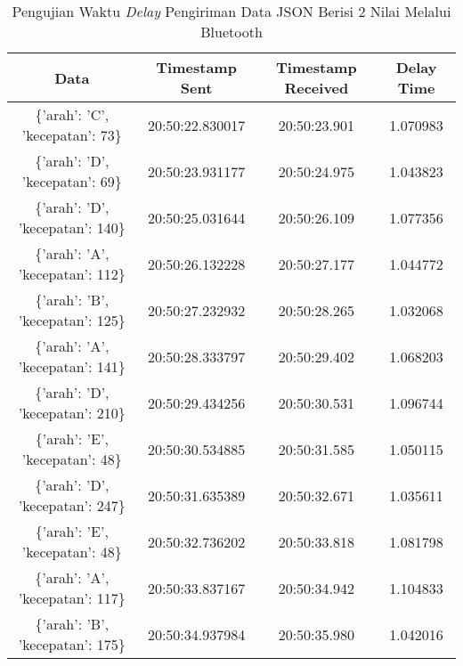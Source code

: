 \begin{longtable}{|ccc|c|}
  \caption{Pengujian Waktu \emph{Delay} Pengiriman Data JSON Berisi 2 Nilai Melalui Bluetooth}
  \label{tbl:delayBluetoothJSON2}\\
    \hline
    \multicolumn{1}{|c|}{Data}                              & \multicolumn{1}{c|}{Timestamp Sent}  & Timestamp Received & Delay Time  \\ \hline
    \endfirsthead
    \endhead
    \multicolumn{1}{|c|}{\{'arah': 'C', 'kecepatan': 73\}}  & \multicolumn{1}{c|}{20:50:22.830017} & 20:50:23.901       & 1.070983    \\ \hline
    \multicolumn{1}{|c|}{\{'arah': 'D', 'kecepatan': 69\}}  & \multicolumn{1}{c|}{20:50:23.931177} & 20:50:24.975       & 1.043823    \\ \hline
    \multicolumn{1}{|c|}{\{'arah': 'D', 'kecepatan': 140\}} & \multicolumn{1}{c|}{20:50:25.031644} & 20:50:26.109       & 1.077356    \\ \hline
    \multicolumn{1}{|c|}{\{'arah': 'A', 'kecepatan': 112\}} & \multicolumn{1}{c|}{20:50:26.132228} & 20:50:27.177       & 1.044772    \\ \hline
    \multicolumn{1}{|c|}{\{'arah': 'B', 'kecepatan': 125\}} & \multicolumn{1}{c|}{20:50:27.232932} & 20:50:28.265       & 1.032068    \\ \hline
    \multicolumn{1}{|c|}{\{'arah': 'A', 'kecepatan': 141\}} & \multicolumn{1}{c|}{20:50:28.333797} & 20:50:29.402       & 1.068203    \\ \hline
    \multicolumn{1}{|c|}{\{'arah': 'D', 'kecepatan': 210\}} & \multicolumn{1}{c|}{20:50:29.434256} & 20:50:30.531       & 1.096744    \\ \hline
    \multicolumn{1}{|c|}{\{'arah': 'E', 'kecepatan': 48\}}  & \multicolumn{1}{c|}{20:50:30.534885} & 20:50:31.585       & 1.050115    \\ \hline
    \multicolumn{1}{|c|}{\{'arah': 'D', 'kecepatan': 247\}} & \multicolumn{1}{c|}{20:50:31.635389} & 20:50:32.671       & 1.035611    \\ \hline
    \multicolumn{1}{|c|}{\{'arah': 'E', 'kecepatan': 48\}}  & \multicolumn{1}{c|}{20:50:32.736202} & 20:50:33.818       & 1.081798    \\ \hline
    \multicolumn{1}{|c|}{\{'arah': 'A', 'kecepatan': 117\}} & \multicolumn{1}{c|}{20:50:33.837167} & 20:50:34.942       & 1.104833    \\ \hline
    \multicolumn{1}{|c|}{\{'arah': 'B', 'kecepatan': 175\}} & \multicolumn{1}{c|}{20:50:34.937984} & 20:50:35.980       & 1.042016    \\ \hline

\end{longtable}
